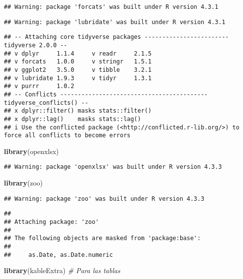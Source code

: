 \documentclass[
]{article}
\newenvironment{Shaded}{\begin{snugshade}}{\end{snugshade}}
\newcommand{\CommentTok}[1]{\textcolor[rgb]{0.56,0.35,0.01}{\textit{#1}}}
\newcommand{\FunctionTok}[1]{\textcolor[rgb]{0.13,0.29,0.53}{\textbf{#1}}}
\newcommand{\NormalTok}[1]{#1}
\begin{document}
\begin{verbatim}
## Warning: package 'forcats' was built under R version 4.3.1
\end{verbatim}

\begin{verbatim}
## Warning: package 'lubridate' was built under R version 4.3.1
\end{verbatim}

\begin{verbatim}
## -- Attaching core tidyverse packages ------------------------ tidyverse 2.0.0 --
## v dplyr     1.1.4     v readr     2.1.5
## v forcats   1.0.0     v stringr   1.5.1
## v ggplot2   3.5.0     v tibble    3.2.1
## v lubridate 1.9.3     v tidyr     1.3.1
## v purrr     1.0.2     
## -- Conflicts ------------------------------------------ tidyverse_conflicts() --
## x dplyr::filter() masks stats::filter()
## x dplyr::lag()    masks stats::lag()
## i Use the conflicted package (<http://conflicted.r-lib.org/>) to force all conflicts to become errors
\end{verbatim}

\begin{Shaded}
\begin{Highlighting}[]
\FunctionTok{library}\NormalTok{(openxlsx)}
\end{Highlighting}
\end{Shaded}

\begin{verbatim}
## Warning: package 'openxlsx' was built under R version 4.3.3
\end{verbatim}

\begin{Shaded}
\begin{Highlighting}[]
\FunctionTok{library}\NormalTok{(zoo)}
\end{Highlighting}
\end{Shaded}

\begin{verbatim}
## Warning: package 'zoo' was built under R version 4.3.3
\end{verbatim}

\begin{verbatim}
## 
## Attaching package: 'zoo'
## 
## The following objects are masked from 'package:base':
## 
##     as.Date, as.Date.numeric
\end{verbatim}

\begin{Shaded}
\begin{Highlighting}[]
\FunctionTok{library}\NormalTok{(kableExtra) }\CommentTok{\# Para las tablas}
\end{Highlighting}
\end{Shaded}
\end{document}
